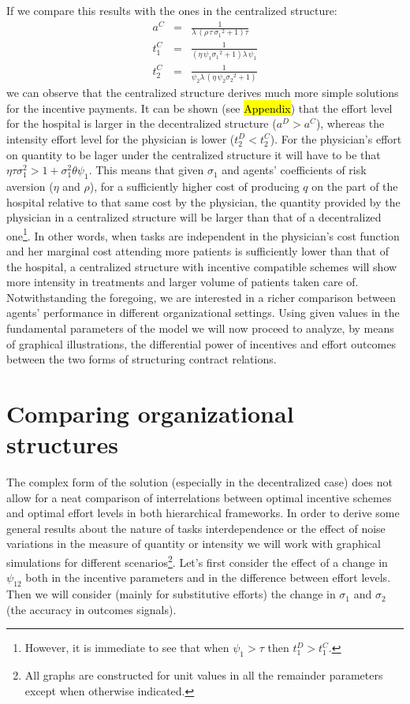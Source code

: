 \documentclass[12pt,letterpaper]{article}
\begin{document}
If we compare this results with the ones in the  centralized structure:
\begin{eqnarray*}
  a^C &=& {\frac {1}{\lambda\, \left( \rho\,\tau\,{\sigma_{{1}}}^{2}+1 \right)
\tau}}\\
  t_1^C &=& {\frac {1}{ \left( \eta\,\psi_{{1}}{\sigma_{{1}}}^{2}+1 \right)
\lambda\,\psi_{{1}}}} \\
  t_2^C &=& {\frac {1}{\psi_{{2}}\lambda\, \left( \eta\,\psi_{{2}}{\sigma_{{2}}}^{
2}+1 \right) }}
\end{eqnarray*}
we can observe that the centralized structure derives much more simple solutions for the incentive payments. It can be shown (see \hl{Appendix}) that the effort level for the hospital is larger in the decentralized structure ($a^D>a^C$), whereas the intensity effort level for the physician is lower ($t_2^D<t_2^C$).  For the physician's effort on quantity to be lager under the centralized structure it will have to be that $\eta\tau\sigma_1^2>1+\sigma_1^2\theta\psi_1$. This means that given $\sigma_1$ and agents' coefficients of risk aversion ($\eta$ and $\rho$), for a sufficiently higher cost of producing $q$ on the part of the hospital relative to that same cost by the physician, the quantity provided by the physician in a centralized structure will be larger than that of a decentralized one\footnote{However, it is immediate to see that when $\psi_1>\tau$ then $t_1^D>t_1^C$.}. In other words, when tasks are independent in the physician's cost function and her marginal cost attending more patients is sufficiently lower than that of the hospital, a centralized structure with incentive compatible schemes will show more intensity in treatments and larger volume of patients taken care of. Notwithstanding the foregoing, we are interested in a richer comparison between agents' performance in different organizational settings. Using given values in the fundamental parameters of the model we will now proceed to analyze, by means of graphical illustrations, the differential power of incentives and effort outcomes between the two forms of structuring contract relations.

\section{Comparing organizational structures}
The complex form of the solution (especially in the decentralized case) does not allow for a neat  comparison of interrelations between optimal incentive schemes and optimal effort levels in both hierarchical frameworks. In order to derive some general results about the nature of tasks interdependence or the effect of noise variations in the measure of quantity or intensity we will work with  graphical simulations for different scenarios\footnote{All graphs are constructed for unit values in all the remainder parameters except when otherwise indicated. }. Let's first consider the effect of a change in $\psi_{12}$ both in the incentive parameters and in the difference between effort levels. Then we will consider (mainly for substitutive efforts) the change in $\sigma_1$ and $\sigma_2$ (the accuracy in outcomes signals).
\end{document}
